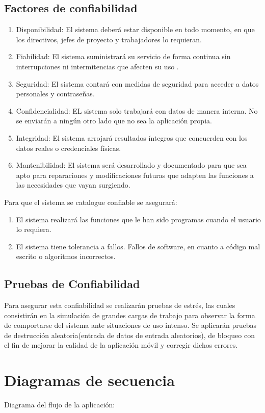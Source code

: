 \documentclass[11pt,a4paper]{article}
\begin{document}
\subsection{Factores de confiabilidad}
\begin{enumerate}
\item Disponibilidad: El sistema deberá estar disponible en todo momento, en que los directivos, jefes de proyecto y trabajadores lo requieran.
\item Fiabilidad: El sistema suministrará su servicio de forma continua sin interrupciones ni intermitencias que afecten su uso .
\item Seguridad: El sistema contará con medidas de seguridad para acceder a datos personales y contraseñas.
\item Confidencialidad: EL sistema solo trabajará con datos de manera interna. No se enviarán a ningún otro lado que no sea la aplicación propia.
\item Integridad: El sistema arrojará resultados íntegros que concuerden con los datos reales o credenciales físicas.
\item Mantenibilidad: El sistema será desarrollado y documentado para que sea apto para reparaciones y modificaciones futuras que adapten las funciones a las necesidades que vayan surgiendo.
\end{enumerate}
Para que el sistema se catalogue confiable se asegurará:
\begin{enumerate}
\item El sistema realizará las funciones que le han sido programas cuando el usuario lo requiera.
\item El sistema tiene tolerancia a fallos. Fallos de software, en cuanto a código mal escrito o algoritmos incorrectos.
\end{enumerate}

\subsection{Pruebas de Confiabilidad}
Para asegurar esta confiabilidad se realizarán pruebas de estrés, las cuales consistirán en la simulación de grandes cargas de trabajo para observar la forma de comportarse del sistema ante situaciones de uso intenso. Se aplicarán pruebas de destrucción aleatoria(entrada de datos de entrada aleatorios), de bloqueo con el fin de mejorar la calidad de la aplicación móvil y corregir dichos errores.

\section{Diagramas de secuencia}
Diagrama del flujo de la aplicación:
\\
\end{document}
